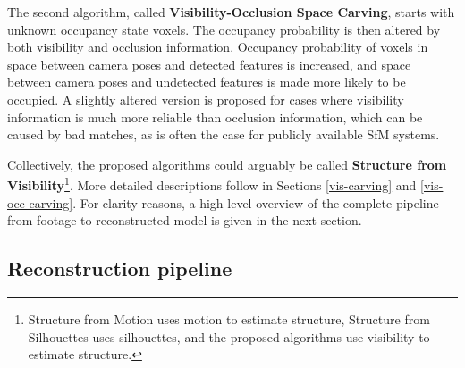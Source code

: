 The second algorithm, called \textbf{Visibility-Occlusion Space Carving}, starts with unknown occupancy state voxels. The occupancy probability is then altered by both visibility and occlusion information. Occupancy probability of voxels in space between camera poses and detected features is increased, and space between camera poses and undetected features is made more likely to be occupied. A slightly altered version is proposed for cases where visibility information is much more reliable than occlusion information, which can be caused by bad matches, as is often the case for publicly available SfM systems.

Collectively, the proposed algorithms could arguably be called \textbf{Structure from Visibility}\footnote{Structure from Motion uses motion to estimate structure, Structure from Silhouettes uses silhouettes, and the proposed algorithms use visibility to estimate structure.}. More detailed descriptions follow in Sections \ref{vis-carving} and \ref{vis-occ-carving}. For clarity reasons, a high-level overview of the complete pipeline from footage to reconstructed model is given in the next section.


\subsection{Reconstruction pipeline}  \label{pipeline}

